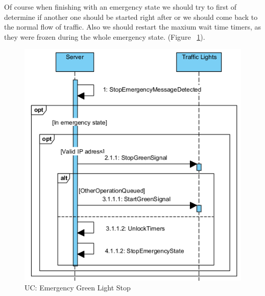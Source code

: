 \documentclass[17pt]{article}
\begin{document}
\indent \indent 
Of course when finishing with an emergency state we should
try to first of determine if another one should be started right
after or we should come back to the normal flow of traffic. Also
we should restart the maxium wait time timers, as they were frozen 
during the whole emergency state. (Figure ~\ref{fig:UC_EmergencyGreenLightStop}).
\begin{figure}[h!]
    \includegraphics[width=\textwidth]{UC/EmergencyStop.png}
    \caption{UC: Emergency Green Light Stop}
    \label{fig:UC_EmergencyGreenLightStop}
\end{figure}
\pagebreak

\pagebreak
\end{document}
